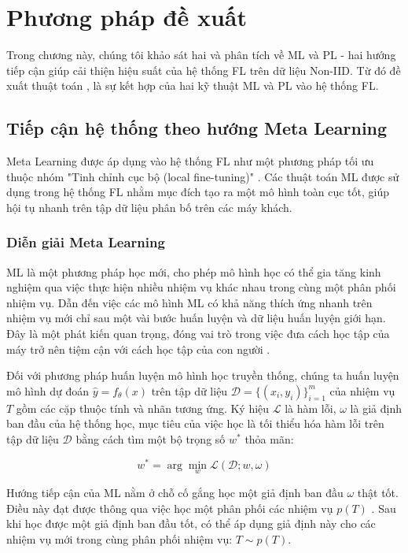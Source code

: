 \chapter{Phương pháp đề xuất}
\label{Chapter3}

Trong chương này, chúng tôi khảo sát hai và phân tích về ML và PL - hai hướng tiếp cận giúp cải thiện hiệu suất của hệ thống FL trên dữ liệu Non-IID. Từ đó đề xuất thuật toán , là sự kết hợp của hai kỹ thuật ML và PL vào hệ thống FL.

\section{Tiếp cận hệ thống theo hướng Meta Learning}

Meta Learning được áp dụng vào hệ thống FL như một phương pháp tối ưu thuộc nhóm "Tinh chỉnh cục bộ (local fine-tuning)" \cite{zhu2021federated}. Các thuật toán ML được sử dụng trong hệ thống FL nhằm mục đích tạo ra một mô hình toàn cục tốt, giúp hội tụ nhanh trên tập dữ liệu phân bố trên các máy khách.

\subsection{Diễn giải Meta Learning}

ML là một phương pháp học mới, cho phép mô hình học có thể gia tăng kinh nghiệm qua việc thực hiện nhiều nhiệm vụ khác nhau trong cùng một phân phối nhiệm vụ. Dẫn đến việc các mô hình ML có khả năng thích ứng nhanh trên nhiệm vụ mới chỉ sau một vài bước huấn luyện và dữ liệu huấn luyện giới hạn. Đây là một phát kiến quan trọng, đóng vai trò trong việc đưa cách học tập của máy trở nên tiệm cận với cách học tập của con người \cite{harlow1949formation}.

Đối với phương pháp huấn luyện mô hình học truyền thống, chúng ta huấn luyện mô hình dự đoán $\hat{y} = f_\theta(x)$ trên tập dữ liệu $\mathcal{D} = \{ (x_i, y_i)\}_{i=1}^m$ của nhiệm vụ $T$ gồm các cặp thuộc tính và nhãn tương ứng. Ký hiệu $\mathcal{L}$ là hàm lỗi, $\omega$ là giả định ban đầu của hệ thống học, mục tiêu của việc học là tối thiểu hóa hàm lỗi trên tập dữ liệu $\mathcal{D}$ bằng cách tìm một bộ trọng số $w^*$ thỏa mãn:

\begin{equation}
    w^* = \arg \min_w \mathcal{L}(\mathcal{D}; w, \omega)
\end{equation}

Hướng tiếp cận của ML nằm ở chỗ cố gắng học một giả định ban đầu $\omega$ thật tốt. Điều này đạt được thông qua việc học một phân phối các nhiệm vụ $p(T)$ \cite{hospedales2020meta}. Sau khi học được một giả định ban đầu tốt, có thể áp dụng giả định này cho các nhiệm vụ mới trong cùng phân phối nhiệm vụ: $T \sim p(T)$.

